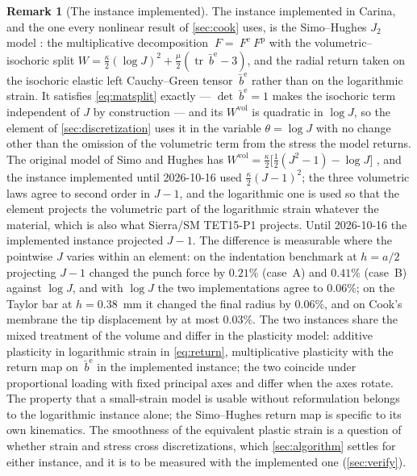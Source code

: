 \documentclass{article}
\newcommand{\F}{~F}
\newcommand{\trace}{\operatorname{tr}}
\newcommand{\supvol}{^{\mathrm{vol}}}
\theoremstyle{definition}
\newtheorem{remark}{Remark}
\theoremstyle{plain}
\begin{document}
\begin{remark}[The instance implemented]
\label{rem:whichj2}
The instance implemented in Carina, and the one every nonlinear result of
\cref{sec:cook} uses, is the Simo--Hughes $J_2$ model
\cite[BOX~9.1]{SimoHughes:1998}: the multiplicative decomposition
$\F = \F^{\mathrm e}\F^{\mathrm p}$ with the volumetric--isochoric split
$W = \tfrac{\kappa}{2}(\log J)^2 + \tfrac{\mu}{2}(\trace\bar{~b}^{\mathrm e} - 3)$,
and the radial return taken on the isochoric elastic left Cauchy--Green
tensor $\bar{~b}^{\mathrm e}$ rather than on the logarithmic strain. It
satisfies \eqref{eq:matsplit} exactly --- $\det\bar{~b}^{\mathrm e} = 1$
makes the isochoric term independent of $J$ by construction --- and its
$W\supvol$ is quadratic in $\log J$, so the element of
\cref{sec:discretization} uses it in the variable $\theta = \log J$ with no
change other than the omission of the volumetric term from the stress the
model returns. The original model of Simo and Hughes has
$W\supvol = \tfrac{\kappa}{2}\big[\tfrac12(J^2-1) - \log J\big]$
\cite[eq.~(9.2.3)]{SimoHughes:1998}, and the instance implemented until
2026-10-16 used $\tfrac{\kappa}{2}(J-1)^2$; the three volumetric laws agree to
second order in $J - 1$, and the logarithmic one is used so that the
element projects the volumetric part of the logarithmic strain whatever the
material, which is also what Sierra/SM TET15-P1 projects. Until 2026-10-16
the implemented instance projected $J - 1$. The difference is measurable
where the pointwise $J$ varies within an element: on the indentation
benchmark at $h = a/2$ projecting $J - 1$ changed the punch force by
$0.21\%$ (case~A) and $0.41\%$ (case~B) against $\log J$, and with $\log
J$ the two implementations agree to $0.06\%$; on the Taylor bar at
$h = 0.38$~mm it changed the final radius by $0.06\%$, and on Cook's
membrane the tip displacement by at most $0.03\%$. The two instances share the mixed treatment of the volume
and differ in the plasticity model: additive plasticity in logarithmic
strain in \eqref{eq:return}, multiplicative plasticity with the return map
on $\bar{~b}^{\mathrm e}$ in the implemented instance; the two coincide
under proportional loading with fixed principal axes and differ when the
axes rotate. The property that a small-strain model is usable without
reformulation belongs to the logarithmic instance alone; the Simo--Hughes
return map is specific to its own kinematics. The smoothness of the
equivalent plastic strain is a question of whether strain and stress cross
discretizations, which \cref{sec:algorithm} settles for either instance,
and it is to be measured with the implemented one (\cref{sec:verify}).
\end{remark}
\end{document}
